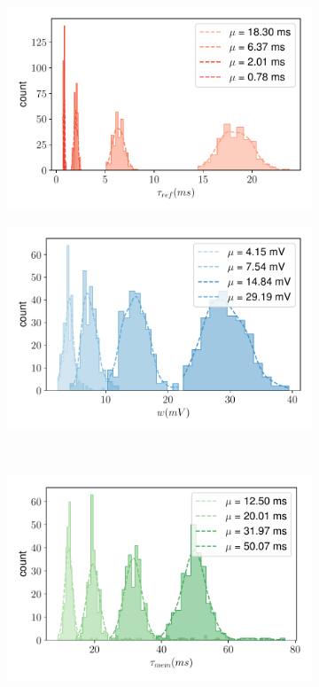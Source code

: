 \begin{figure}[b!]
\centering
  \begin{subfigure}{.47\textwidth}
    \includegraphics[width=\textwidth]{img/chapter4/scaling_tau_ref.pdf}
    \subcaption{}
    \label{fig:tau_ref_scaling}
  \end{subfigure}
  \centering
  \begin{subfigure}{.47\textwidth}
    \includegraphics[width=\textwidth]{img/chapter4/scaling_nmda.pdf}
    \subcaption{}
    \label{fig:nmda_wgt_scaling}
  \end{subfigure}\\
  \centering
  \begin{subfigure}{.47\textwidth}
    \includegraphics[width=\textwidth]{img/chapter4/scaling_tau_mem.pdf}

\end{subfigure}
\end{figure}
